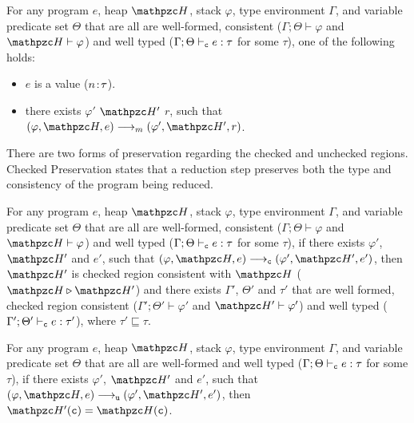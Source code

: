 \begin{thm}[Progress]\label{thm:progress}

For any \systemname program $e$, heap $\heap$, stack
$\varphi$, type environment $\Gamma$, and variable predicate set $\Theta$
that are all are well-formed, consistent
($\Gamma;\Theta\vdash \varphi$ and $\heap \vdash \varphi$) and well
typed ($\Gamma;\Theta\vdash_{\texttt{c}} e : \tau$ for some $\tau$),
one of the following holds:

\begin{itemize}

\item $e$ is a value (${n}\!:\!{\tau}$).

\item there exists $\varphi'$ $\heap'$ $r$, such that $(\varphi,\heap,e) \longrightarrow_m (\varphi',\heap',r)$.

\end{itemize}
\end{thm}

\noindent
There are two forms of preservation regarding the checked and unchecked regions.
Checked Preservation states that a reduction step preserves both the
type and consistency of the program being reduced.

\begin{thm}
For any \systemname program $e$, heap $\heap$, stack
$\varphi$, type environment $\Gamma$, and variable predicate set $\Theta$
that are all are well-formed, consistent
($\Gamma;\Theta\vdash \varphi$ and $\heap \vdash \varphi$) and well
typed ($\Gamma;\Theta\vdash_{\texttt{c}} e : \tau$ for some $\tau$), if there exists $\varphi'$,
$\heap'$ and $e'$, such that $(\varphi,\heap,e)
\longrightarrow_{\cmode} (\varphi',\heap',e')$, then $\heap'$ is
checked region consistent with $\heap$ ($\heap \triangleright \heap'$) and there exists
$\Gamma'$, $\Theta'$ and $\tau'$ that are well formed, checked region consistent
($\Gamma';\Theta'\vdash \varphi'$ and $\heap' \vdash \varphi'$) and
well typed ($\Gamma';\Theta' \vdash_{\texttt{c}} e: \tau'$), where
$\tau'\sqsubseteq \tau$.
\end{thm}
\begin{thm}
For any \systemname program $e$, heap $\heap$, stack
$\varphi$, type environment $\Gamma$, and variable predicate set $\Theta$
that are all are well-formed and well
typed ($\Gamma;\Theta\vdash_{\texttt{c}} e : \tau$ for some $\tau$), if there exists $\varphi'$,
$\heap'$ and $e'$, such that $(\varphi,\heap,e)
\longrightarrow_{\umode} (\varphi',\heap',e')$, then $\heap'(\cmode)=\heap(\cmode)$.
\end{thm}

